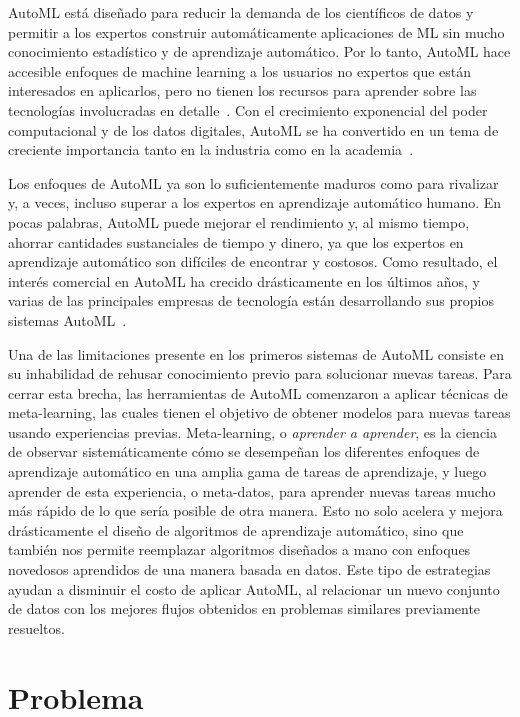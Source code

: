 AutoML está diseñado para reducir la demanda de los científicos de datos y permitir a los expertos construir automáticamente aplicaciones de ML sin mucho conocimiento estadístico y de aprendizaje automático. Por lo tanto, AutoML hace accesible enfoques de machine learning a los usuarios no expertos que están interesados en aplicarlos, pero no tienen los recursos para aprender sobre las tecnologías involucradas en detalle~\cite{hutter2019autmlbook}. Con el crecimiento exponencial del poder computacional y de los datos digitales, AutoML se ha convertido en un tema de creciente importancia tanto en la industria como en la academia~\cite{xin2019automl}. 

Los enfoques de AutoML ya son lo suficientemente maduros como para
rivalizar y, a veces, incluso superar a los expertos en aprendizaje automático humano. En pocas palabras, AutoML puede mejorar el rendimiento y, al mismo tiempo, ahorrar cantidades sustanciales de tiempo y dinero, ya que los expertos en aprendizaje automático son difíciles de encontrar y costosos. Como resultado, el interés comercial en AutoML ha crecido drásticamente en los últimos años, y varias de las principales empresas de tecnología están desarrollando sus propios sistemas AutoML~\cite{hutter2019autmlbook}.

Una de las limitaciones presente en los primeros sistemas de AutoML consiste en su inhabilidad de rehusar conocimiento previo para solucionar nuevas tareas. Para cerrar esta brecha, las herramientas de AutoML comenzaron a aplicar técnicas de meta-learning, las cuales tienen el objetivo de obtener modelos para nuevas tareas usando experiencias previas. Meta-learning, o \textit{aprender a aprender}, es la ciencia de observar sistemáticamente cómo se desempeñan los diferentes enfoques de aprendizaje automático en una amplia gama de tareas de aprendizaje, y luego aprender de esta experiencia, o meta-datos, para aprender nuevas tareas mucho más rápido de lo que sería posible de otra manera. Esto no solo acelera y mejora drásticamente el diseño de algoritmos de aprendizaje automático, sino que también nos permite reemplazar algoritmos diseñados a mano con enfoques novedosos aprendidos de una manera basada en datos. Este tipo de estrategias ayudan a disminuir el costo de aplicar AutoML, al relacionar un nuevo conjunto de datos con los mejores flujos obtenidos en problemas similares previamente resueltos. 

\section*{Problema}

